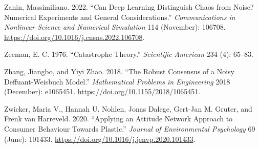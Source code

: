 \documentclass[
  letterpaper,
]{scrbook}
\newlength{\cslhangindent}
\newlength{\cslentryspacingunit} %
\newenvironment{CSLReferences}[2] %
 {%
  \setlength{\parindent}{0pt}
  \ifodd #1
  \let\oldpar\par
  \def\par{\hangindent=\cslhangindent\oldpar}
  \fi
  \setlength{\parskip}{#2\cslentryspacingunit}
 }%
 {}
\begin{document}
\begin{CSLReferences}{1}{0}
\leavevmode{}%
Zanin, Massimiliano. 2022. {``Can Deep Learning Distinguish Chaos from
Noise? Numerical Experiments and General Considerations.''}
\emph{Communications in Nonlinear Science and Numerical Simulation} 114
(November): 106708. \url{https://doi.org/10.1016/j.cnsns.2022.106708}.

\leavevmode{}%
Zeeman, E. C. 1976. {``Catastrophe {Theory}.''} \emph{Scientific
American} 234 (4): 65--83.

\leavevmode{}%
Zhang, Jiangbo, and Yiyi Zhao. 2018. {``The {Robust Consensus} of a
{Noisy Deffuant-Weisbuch Model}.''} \emph{Mathematical Problems in
Engineering} 2018 (December): e1065451.
\url{https://doi.org/10.1155/2018/1065451}.

\leavevmode{}%
Zwicker, Maria V., Hannah U. Nohlen, Jonas Dalege, Gert-Jan M. Gruter,
and Frenk van Harreveld. 2020. {``Applying an Attitude Network Approach
to Consumer Behaviour Towards Plastic.''} \emph{Journal of Environmental
Psychology} 69 (June): 101433.
\url{https://doi.org/10.1016/j.jenvp.2020.101433}.

\end{CSLReferences}


\backmatter

\printindex
\end{document}
